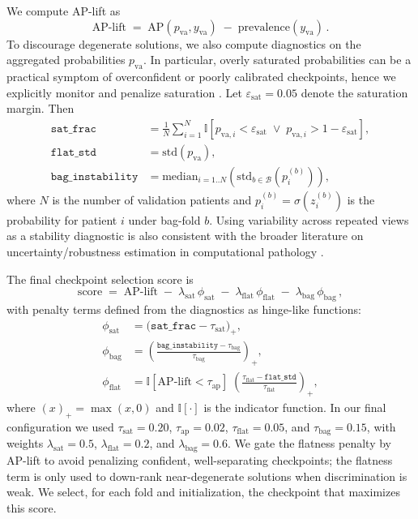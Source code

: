 We compute AP-lift as
\begin{equation}\label{eq:ap_lift}
\mathrm{AP\text{-}lift} \;=\; \mathrm{AP}(p_{\text{va}}, y_{\text{va}}) \;-\; \mathrm{prevalence}(y_{\text{va}})\,.
\end{equation}
To discourage degenerate solutions, we also compute diagnostics on the aggregated probabilities $p_{\text{va}}$. In particular, overly saturated probabilities can be a practical symptom of overconfident or poorly calibrated checkpoints, hence we explicitly monitor and penalize saturation \cite{kurz2023calibrationWSI}.
Let $\varepsilon_{\text{sat}}=0.05$ denote the saturation margin. Then
\begin{align}
\texttt{sat\_frac} &= \frac{1}{N}\sum_{i=1}^{N}\mathbb{I}\!\left[p_{\text{va},i}<\varepsilon_{\text{sat}} \;\lor\; p_{\text{va},i}>1-\varepsilon_{\text{sat}}\right], \\
\texttt{flat\_std} &= \mathrm{std}\!\left(p_{\text{va}}\right), \\
\texttt{bag\_instability} &= \mathrm{median}_{i=1..N}\left(\mathrm{std}_{b\in\mathcal{B}}\left(p^{(b)}_{i}\right)\right),
\end{align}
where $N$ is the number of validation patients and $p^{(b)}_{i}=\sigma\!\left(z^{(b)}_{i}\right)$ is the probability for patient $i$ under bag-fold $b$. Using variability across repeated views as a stability diagnostic is also consistent with the broader literature on uncertainty/robustness estimation in computational pathology \cite{mehrtens2023uncertaintyHistopath}.

The final checkpoint selection score is
\begin{equation}\label{eq:selection_score}
\mathrm{score} \;=\; \mathrm{AP\text{-}lift} \;-\; \lambda_{\text{sat}}\,\phi_{\text{sat}}
\;-\; \lambda_{\text{flat}}\,\phi_{\text{flat}}
\;-\; \lambda_{\text{bag}}\,\phi_{\text{bag}}\,,
\end{equation}
with penalty terms defined from the diagnostics as hinge-like functions:
\begin{align}
\phi_{\text{sat}} &= \big(\texttt{sat\_frac}-\tau_{\text{sat}}\big)_+, \\
\phi_{\text{bag}} &= \left(\frac{\texttt{bag\_instability}-\tau_{\text{bag}}}{\tau_{\text{bag}}}\right)_+, \\
\phi_{\text{flat}} &=
\mathbb{I}\!\left[\mathrm{AP\text{-}lift}<\tau_{\text{ap}}\right]\;
\left(\frac{\tau_{\text{flat}}-\texttt{flat\_std}}{\tau_{\text{flat}}}\right)_+,
\end{align}
where $(x)_+=\max(x,0)$ and $\mathbb{I}[\cdot]$ is the indicator function.
In our final configuration we used $\tau_{\text{sat}}=0.20$, $\tau_{\text{ap}}=0.02$, $\tau_{\text{flat}}=0.05$, and $\tau_{\text{bag}}=0.15$, with weights $\lambda_{\text{sat}}=0.5$, $\lambda_{\text{flat}}=0.2$, and $\lambda_{\text{bag}}=0.6$.
We gate the flatness penalty by AP-lift to avoid penalizing confident, well-separating checkpoints; the flatness term is only used to down-rank near-degenerate solutions when discrimination is weak.
We select, for each fold and initialization, the checkpoint that maximizes this score.



